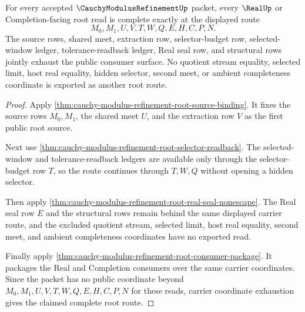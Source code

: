 \begin{theorem}
\label{thm:cauchy-modulus-refinement-root-route-completeness}
For every accepted $\CauchyModulusRefinementUp$ packet, every $\RealUp$ or Completion-facing root read is complete exactly at the displayed route
$$
M_0,M_1,U,V,T,W,Q,E,H,C,P,N.
$$
The source rows, shared meet, extraction row, selector-budget row, selected-window ledger, tolerance-readback ledger, Real seal row, and structural rows jointly exhaust the public consumer surface. No quotient stream equality, selected limit, host real equality, hidden selector, second meet, or ambient completeness coordinate is exported as another root route.
\end{theorem}
\begin{proof}
Apply \autoref{thm:cauchy-modulus-refinement-root-source-binding}. It fixes the source rows $M_0,M_1$, the shared meet $U$, and the extraction row $V$ as the first public root source.

Next use \autoref{thm:cauchy-modulus-refinement-root-selector-readback}. The selected-window and tolerance-readback ledgers are available only through the selector-budget row $T$, so the route continues through $T,W,Q$ without opening a hidden selector.

Then apply \autoref{thm:cauchy-modulus-refinement-root-real-seal-nonescape}. The Real seal row $E$ and the structural rows remain behind the same displayed carrier route, and the excluded quotient stream, selected limit, host real equality, second meet, and ambient completeness coordinates have no exported read.

Finally apply \autoref{thm:cauchy-modulus-refinement-root-consumer-package}. It packages the Real and Completion consumers over the same carrier coordinates. Since the packet has no public coordinate beyond $M_0,M_1,U,V,T,W,Q,E,H,C,P,N$ for these reads, carrier coordinate exhaustion gives the claimed complete root route.
\end{proof}

